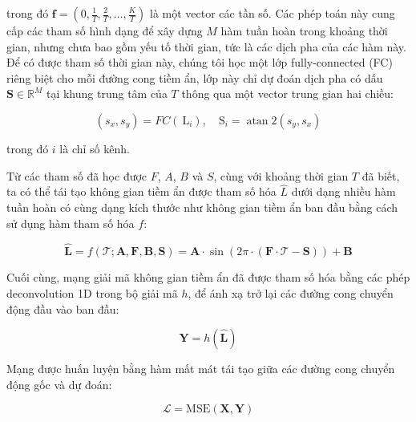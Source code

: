 trong đó $\textbf{f} = (0, \frac{1}{T}, \frac{2}{T}, \dots, \frac{K}{T})$ là một vector các tần số. Các phép toán này cung cấp các tham số hình dạng để xây dựng $M$ hàm tuần hoàn trong khoảng thời gian, nhưng chưa bao gồm yếu tố thời gian, tức là các dịch pha của các hàm này. Để có được tham số thời gian này, chúng tôi học một lớp fully-connected (FC) riêng biệt cho mỗi đường cong tiềm ẩn, lớp này chỉ dự đoán dịch pha có dấu $\textbf{S} \in \mathbb{R}^{M}$ tại khung trung tâm của $T$ thông qua một vector trung gian hai chiều:

\begin{equation}
	\label{eq:OffsetExtraction}
	\left(s_x, s_y\right)=F C\left(\mathrm{~L}_i\right), \quad \mathrm{S}_i=\operatorname{atan} 2\left(s_y, s_x\right)
\end{equation}

trong đó $i$ là chỉ số kênh.

Từ các tham số đã học được $F$, $A$, $B$ và $S$, cùng với khoảng thời gian $T$ đã biết, ta có thể tái tạo không gian tiềm ẩn được tham số hóa $\hat{L}$ dưới dạng nhiều hàm tuần hoàn có cùng dạng kích thước như không gian tiềm ẩn ban đầu bằng cách sử dụng hàm tham số hóa $f$:

\begin{equation}
	\label{eq:Sinusoidal}
	\hat{\mathbf{L}}=f(\mathcal{T} ; \mathbf{A}, \mathbf{F}, \mathbf{B}, \mathbf{S})=\mathbf{A} \cdot \sin (2 \pi \cdot(\mathbf{F} \cdot \mathcal{T}-\mathbf{S}))+\mathbf{B}
\end{equation}


Cuối cùng, mạng giải mã không gian tiềm ẩn đã được tham số hóa bằng các phép deconvolution 1D trong bộ giải mã $h$, để ánh xạ trở lại các đường cong chuyển động đầu vào ban đầu:

\begin{equation}
	\label{eq:Decoder}
	\textbf{Y} = h(\hat{\textbf{L}})
\end{equation}

Mạng được huấn luyện bằng hàm mất mát tái tạo giữa các đường cong chuyển động gốc và dự đoán:

\begin{equation}
	\label{eq:LossFunction}
	\mathcal{L} = \text{MSE}(\textbf{X}, \textbf{Y})
\end{equation}

